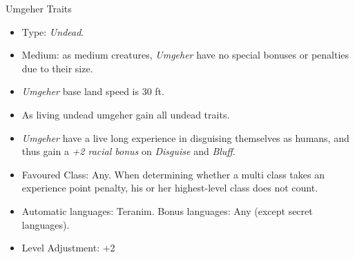 \begin{35e}{Umgeher Traits}
  \begin{itemize}[noitemsep]
    \item Type: \emph{Undead}.
    \item Medium: as medium creatures, \emph{Umgeher} have no special bonuses or
      penalties due to their size.
    \item \emph{Umgeher} base land speed is 30 ft.
    \item As living undead umgeher gain all undead traits.
    \item \emph{Umgeher} have a live long experience in disguising themselves as
      humans, and thus gain a \emph{+2 racial bonus} on \emph{Disguise} and
      \emph{Bluff}.
    \item Favoured Class: Any. When determining whether a multi class takes an
      experience point penalty, his or her highest-level class does not count.
    \item Automatic languages: Teranim. Bonus languages: Any (except secret
      languages).
    \item Level Adjustment: +2
  \end{itemize}
\end{35e}
